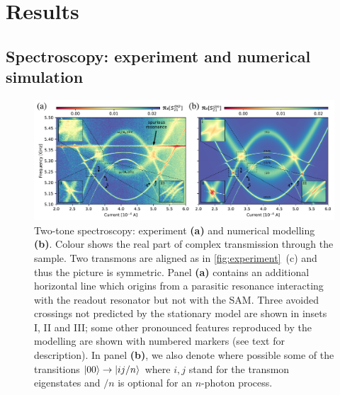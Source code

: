 \documentclass[%
 aip,
 amsmath,amssymb,
 reprint,%
]{revtex4-1}
\begin{document}
\section{Results}

\subsection{\label{sec:level1} Spectroscopy: experiment and numerical simulation}

\begin{figure}
	
	\centering
	\includegraphics[width=\linewidth]{main_picture}
	\caption{Two-tone spectroscopy: experiment \textbf{(a)} and numerical modelling \textbf{(b)}. Colour shows the real part of complex transmission  through the sample. Two transmons are aligned as in \autoref{fig:experiment}~(c) and thus the picture is symmetric. Panel \textbf{(a)} contains an additional horizontal line which origins from a parasitic resonance interacting with the readout resonator but not with the SAM. Three avoided crossings not predicted by the stationary model are shown in insets I, II and III; some other pronounced features reproduced by the modelling are shown with numbered markers (see text for description). In panel \textbf{(b)}, we also denote where possible some of the transitions $\ket{00}\rightarrow \ket{ij/n}$ where $i,j$ stand for the transmon eigenstates and $/n$ is optional for an $n$-photon process.}
	\label{fig:two-tone}
\end{figure}
\end{document}
